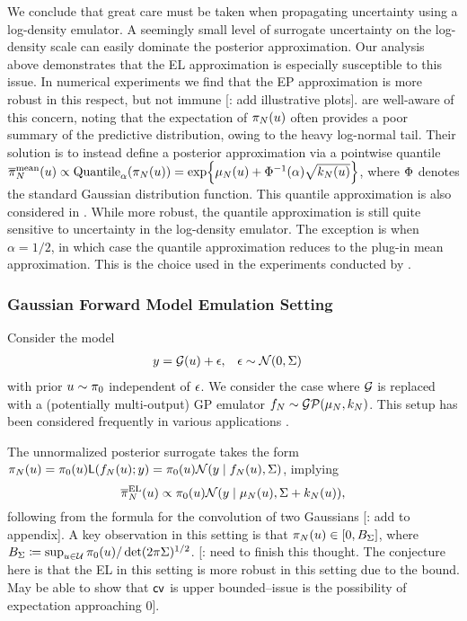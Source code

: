 \documentclass[12pt]{article}
\begin{document}
We conclude that great care must be taken when propagating uncertainty using a log-density emulator. 
A seemingly small level of surrogate uncertainty on the log-density scale can easily dominate the posterior
approximation. Our analysis above demonstrates that the EL approximation is especially susceptible to 
this issue. In numerical experiments we find that the EP approximation is more robust in this respect, 
but not immune [\todo: add illustrative plots]. \citet{VehtariParallelGP} are well-aware of this concern, 
noting that the expectation of $\pi_{N}(u)$ often provides a poor summary of the predictive distribution, 
owing to the heavy log-normal tail. Their solution is to instead define a posterior approximation via a pointwise 
quantile 
$\overline{\pi}_{N}^{\textrm{mean}}(u) \propto \mathrm{Quantile}_{\alpha}(\pi_{N}(u)) = \exp\mathopen{}\left\{\mu_{N}(u) + \Phi^{-1}(\alpha) \sqrt{k_{N}(u)}\right\}\mathclose{}$, where $\Phi$ denotes the standard Gaussian distribution function.
This quantile approximation is also considered in \citet{quantileApprox,FATES_CES}. While more robust, the quantile 
approximation is still quite sensitive to uncertainty in the log-density emulator. The exception is when $\alpha = 1/2$, in which 
case the quantile approximation reduces to the plug-in mean approximation. This is the choice used in the experiments
conducted by \citet{VehtariParallelGP}. 

\subsubsection{Gaussian Forward Model Emulation Setting} \label{sec:fwd-Gaussian} 
Consider the model
\begin{align}
&y = \mathcal{G}(u) + \epsilon, &&\epsilon \sim \mathcal{N}(0, \Sigma)
\end{align}
with prior $u \sim \pi_0$ independent of $\epsilon$. We consider the case 
where $\mathcal{G}$ is replaced with a (potentially multi-output) GP emulator 
$f_{N} \sim \mathcal{GP}(\mu_{N}, k_{N})$. This setup has been considered frequently in various 
applications \citep{Surer2023sequential,weightedIVAR,StuartTeck2,GP_PDE_priors,CES,
idealizedGCM,villani2024posteriorsamplingadaptivegaussian,hydrologicalModel,hydrologicalModel2}.

The unnormalized posterior surrogate takes the form 
$\pi_{N}(u) = \pi_0(u)\mathsf{L}(f_{N}(u); y) =  \pi_0(u)\mathcal{N}(y \mid f_{N}(u), \Sigma)$, implying
\begin{equation}
\overline{\pi}_{N}^{\mathrm{EL}}(u) \propto \pi_0(u) \mathcal{N}(y \mid \mu_{N}(u), \Sigma + k_{N}(u)),
\label{eq:EL-Gaussian-fwd}
\end{equation}
following from the formula for the convolution of two Gaussians [\todo: add to appendix].
A key observation in this setting is that $\pi_{N}(u) \in [0, B_{\Sigma}]$, where 
$B_{\Sigma} \coloneqq \sup_{u \in \mathcal{U}} \pi_0(u) / \det(2\pi\Sigma)^{1/2}$.
[\todo: need to finish this thought. The conjecture here is that the EL in this setting is 
more robust in this setting due to the bound. May be able to show that $\mathsf{cv}$ is upper
bounded--issue is the possibility of expectation approaching 0].
\end{document}
